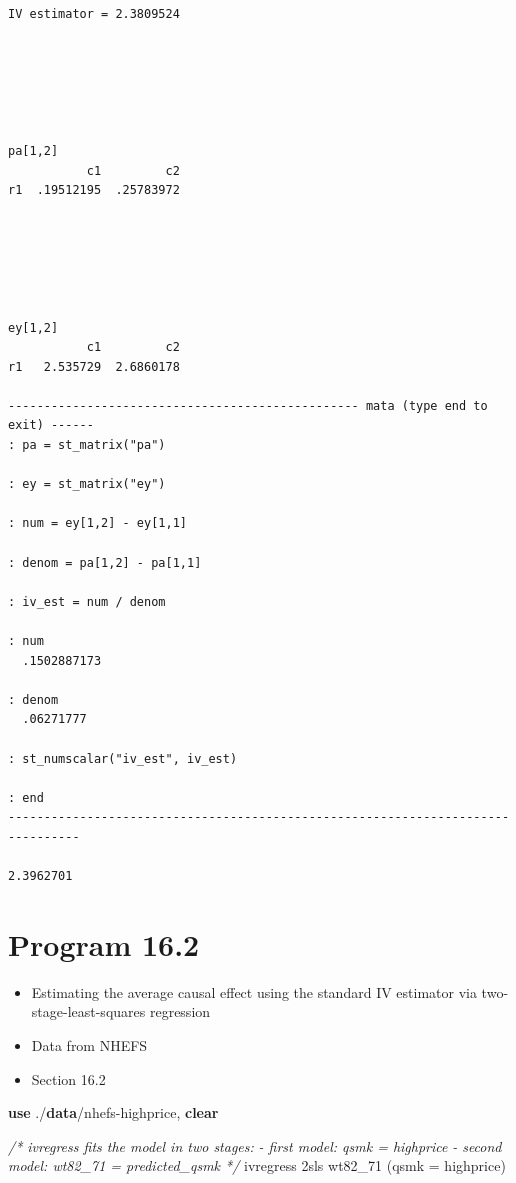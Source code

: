 \documentclass[
  10pt,
]{book}
\newenvironment{Shaded}{\begin{snugshade}}{\end{snugshade}}
\newcommand{\CommentTok}[1]{\textcolor[rgb]{0.56,0.35,0.01}{\textit{#1}}}
\newcommand{\KeywordTok}[1]{\textcolor[rgb]{0.13,0.29,0.53}{\textbf{#1}}}
\newcommand{\NormalTok}[1]{#1}
\providecommand{\tightlist}{%
  \setlength{\itemsep}{0pt}\setlength{\parskip}{0pt}}
\begin{document}
\begin{verbatim}
IV estimator = 2.3809524






pa[1,2]
           c1         c2
r1  .19512195  .25783972






ey[1,2]
           c1         c2
r1   2.535729  2.6860178

------------------------------------------------- mata (type end to exit) ------
: pa = st_matrix("pa")

: ey = st_matrix("ey")

: num = ey[1,2] - ey[1,1] 

: denom = pa[1,2] - pa[1,1]

: iv_est = num / denom 

: num
  .1502887173

: denom
  .06271777

: st_numscalar("iv_est", iv_est)

: end
--------------------------------------------------------------------------------

2.3962701
\end{verbatim}

\hypertarget{program-16.2-1}{%
\section{Program 16.2}\label{program-16.2-1}}

\begin{itemize}
\tightlist
\item
  Estimating the average causal effect using the standard IV estimator via two-stage-least-squares regression
\item
  Data from NHEFS
\item
  Section 16.2
\end{itemize}

\begin{Shaded}
\begin{Highlighting}[]
\KeywordTok{use}\NormalTok{ ./}\KeywordTok{data}\NormalTok{/nhefs{-}highprice, }\KeywordTok{clear}

\CommentTok{/* ivregress fits the model in two stages:}
\CommentTok{{-} first model: qsmk = highprice}
\CommentTok{{-} second model: wt82\_71 = predicted\_qsmk */}
\NormalTok{ivregress 2sls wt82\_71 (qsmk = highprice)}
\end{Highlighting}
\end{Shaded}
\end{document}
